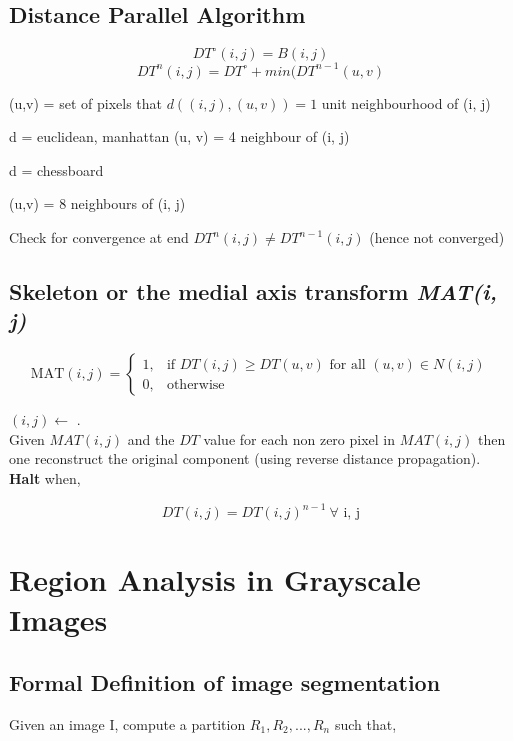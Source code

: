 \documentclass[11pt]{article}
\theoremstyle{definition}
\begin{document}
\subsection{Distance Parallel Algorithm}
\[DT^\circ (i, j) = B(i, j)\]
\[DT^n (i, j) = DT^\circ + min (DT^{n-1}(u,v)\]

(u,v) = set of pixels that $d((i,j), (u, v)) = 1$ unit neighbourhood of (i, j)

d = euclidean, manhattan (u, v) = 4 neighbour of (i, j)

d = chessboard 

(u,v) = 8 neighbours of (i, j)

Check for convergence at end $DT^n (i, j) \neq DT^{n-1}(i, j)$ (hence not converged)
\subsection{Skeleton or the medial axis transform \textit{MAT(i, j)}}
\begin{shaded}
    \begin{equation}
        \text{MAT}(i, j) = \begin{cases}   1, & \text{if } DT(i, j) \geq DT(u, v) \text{ for all } (u, v) \in N(i, j) \\   0, & \text{otherwise} \end{cases}
    \end{equation}
\end{shaded}

$(i, j) \longleftarrow$ .\\
Given $MAT (i, j)$ and the $DT$ value for each non zero pixel in $MAT (i, j)$ then one reconstruct the original component (using reverse distance propagation).
\\ \textbf{Halt} when, 
\begin{shaded}
    \begin{equation}
        DT (i, j) = DT(i, j) ^{n-1} \ \forall \text{ i, j}
    \end{equation}
\end{shaded}
\newpage

\section{Region Analysis in Grayscale Images}

\subsection{Formal Definition of image segmentation }
Given an image I, compute a partition $R_1, R_2,...,R_n $ such that,
\end{document}
